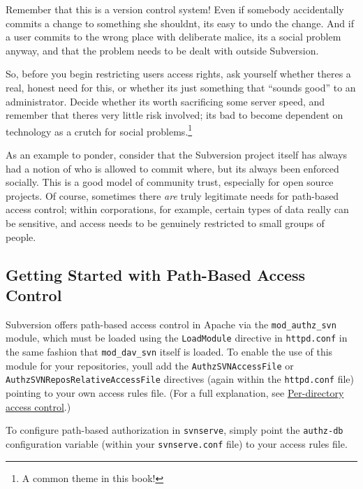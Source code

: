 Remember that this is a version control system! Even if somebody
accidentally commits a change to something she
shouldn\textquotesingle t, it\textquotesingle s easy to undo the change.
And if a user commits to the wrong place with deliberate malice,
it\textquotesingle s a social problem anyway, and that the problem needs
to be dealt with outside Subversion.

So, before you begin restricting users\textquotesingle{} access rights,
ask yourself whether there\textquotesingle s a real, honest need for
this, or whether it\textquotesingle s just something that ``sounds
good'' to an administrator. Decide whether it\textquotesingle s worth
sacrificing some server speed, and remember that there\textquotesingle s
very little risk involved; it\textquotesingle s bad to become dependent
on technology as a crutch for social problems.\footnote{A common theme
  in this book!}

As an example to ponder, consider that the Subversion project itself has
always had a notion of who is allowed to commit where, but
it\textquotesingle s always been enforced socially. This is a good model
of community trust, especially for open source projects. Of course,
sometimes there \emph{are} truly legitimate needs for path-based access
control; within corporations, for example, certain types of data really
can be sensitive, and access needs to be genuinely restricted to small
groups of people.

\subsection{Getting Started with Path-Based Access
Control}\label{svn.serverconfig.pathbasedauthz.getting-started}

Subversion offers path-based access control in Apache via the
\texttt{mod\_authz\_svn} module, which must be loaded using the
\texttt{LoadModule} directive in \texttt{httpd.conf} in the same fashion
that \texttt{mod\_dav\_svn} itself is loaded. To enable the use of this
module for your repositories, you\textquotesingle ll add the
\texttt{AuthzSVNAccessFile} or \texttt{AuthzSVNReposRelativeAccessFile}
directives (again within the \texttt{httpd.conf} file) pointing to your
own access rules file. (For a full explanation, see
\hyperref[svn.serverconfig.httpd.authz.perdir]{Per-directory access
control}.)

To configure path-based authorization in \texttt{svnserve}, simply point
the \texttt{authz-db} configuration variable (within your
\texttt{svnserve.conf} file) to your access rules file.

